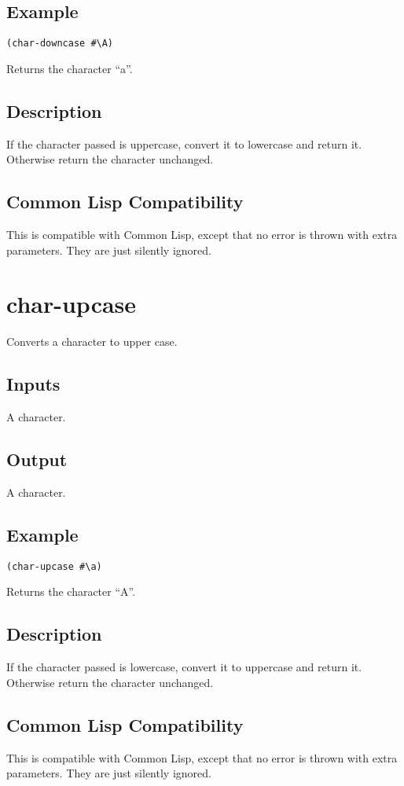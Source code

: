 \documentclass[10pt, openany]{book}
\newcommand{\cl}{Common Lisp}
\begin{document}
\subsection{Example}
\begin{lstlisting}
(char-downcase #\A)
\end{lstlisting}
Returns the character ``a''.
\subsection{Description}
If the character passed is uppercase, convert it to lowercase and return it.  Otherwise return the character unchanged.
\subsection{Common Lisp Compatibility}
This is compatible with \cl, except that no error is thrown with extra parameters.  They are just silently ignored.

\section{char-upcase}
Converts a character to upper case.
\subsection{Inputs}
A character.
\subsection{Output}
A character.
\subsection{Example}
\begin{lstlisting}
(char-upcase #\a)
\end{lstlisting}
Returns the character ``A''.
\subsection{Description}
If the character passed is lowercase, convert it to uppercase and return it.  Otherwise return the character unchanged.
\subsection{Common Lisp Compatibility}
This is compatible with \cl, except that no error is thrown with extra parameters.  They are just silently ignored.
\end{document}
